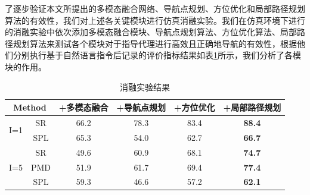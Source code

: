 了逐步验证本文所提出的多模态融合网络、导航点规划、方位优化和局部路径规划算法的有效性，我们对上述各关键模块进行仿真消融实验。我们在仿真环境下进行的消融实验中依次添加多模态融合模块、导航点规划算法、方位优化算法、局部路径规划算法来测试各个模块对于指导代理进行高效且正确地导航的有效性，根据他们分别执行基于自然语言指令后记录的评价指标结果如表\ref{Ablationtable}所示，我们分析了各模块的作用。

\begin{table}[]
    \caption{\label{Ablationtable}消融实验结果}
    \centering
        \begin{tabular}{cc|c|c|c|c}
        \hline
        \multicolumn{2}{c|}{Method}                     & +多模态融合 & +导航点规划 & +方位优化 & +局部路径规划 \\ \hline
        \multicolumn{1}{c|}{\multirow{2}{*}{I=1}} & SR  & 66.2   & 78.3   & 83.4  & \textbf{88.4}    \\
        \multicolumn{1}{c|}{}                     & SPL & 65.3   & 54.0   & 62.7  & \textbf{66.7}    \\ \hline
        \multicolumn{1}{c|}{\multirow{3}{*}{I=5}} & SR  & 49.6   & 60.9   & 68.1  & \textbf{74.7}    \\
        \multicolumn{1}{c|}{}                     & PMD & 51.9   & 61.7   & 69.4  & \textbf{77.4}    \\
        \multicolumn{1}{c|}{}                     & SPL & 59.3   & 46.6   & 57.2  & \textbf{62.1}    \\ \hline
        \end{tabular}
    \end{table}

